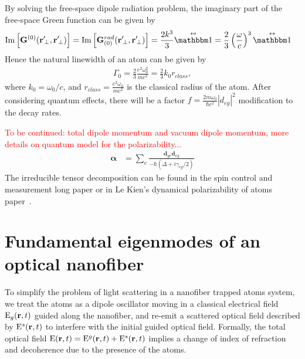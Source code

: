 By solving the free-space dipole radiation problem, the imaginary part of the free-space Green function can be given by
\begin{align}
\mathrm{Im}\left[ \mathbf{G}^{(0)} (\br^\prime\!_\perp, \br^\prime\!_\perp) \right] &= \mathrm{Im} 
\left[ \mathbf{G}^{rad}_{(0)}(\br'\!_\perp,\br'\!_\perp)\right]  = \frac{ 
2k^3}{3}\eye = \frac{2}{3}\left(\frac{ 
\omega}{c}\right)^3\eye
\end{align}
Hence the natural linewidth of an atom can be given by
\begin{align}
\Gamma_0 = \frac{2}{3}\frac{e^2\omega_0^2}{mc^3}=\frac{2}{3}k_0r_{class},
\end{align}
where $ k_0=\omega_0/c $, and $ r_{class}= \frac{e^2\omega_0}{mc^2}$ is the classical radius of the atom. After considering quantum effects, there will be a factor $ f=\frac{2m\omega_0}{\hbar e^2}|d_{eg}|^2 $ modification to the decay rates. 

\textcolor{red}{To be continued: total dipole momentum and vacuum dipole momentum, more details on quantum model for the polarizability...}
\begin{align}
\boldsymbol{\alpha} &= \sum_e \frac{\mathbf{d}_{ge}\mathbf{d}_{eg}}{-\hbar(\Delta+i\gamma_{eg}/2)}
\end{align}
The irreducible tensor decomposition can be found in the spin control and measurement long paper\cite{Deutsch2010a} or in Le Kien's dynamical polarizability of atoms paper~\cite{LeKien2013}. 







\section{Fundamental eigenmodes of an optical nanofiber}
To simplify the problem of light scattering in a nanofiber trapped atoms system, we treat the atoms as a dipole oscillator moving in a classical electrical field $ \mathrm{E}_{g}(\mathbf{r},t) $ guided along the nanofiber, and re-emit a scattered optical field described by $ \mathrm{E}^s(\mathbf{r},t) $ to interfere with the initial guided optical field. Formally, the total optical field $ \mathrm{E}(\mathbf{r},t)= \mathrm{E}^g(\mathbf{r},t)  + \mathrm{E}^s(\mathbf{r},t) $ implies a change of index of refraction and decoherence due to the presence of the atoms. 

